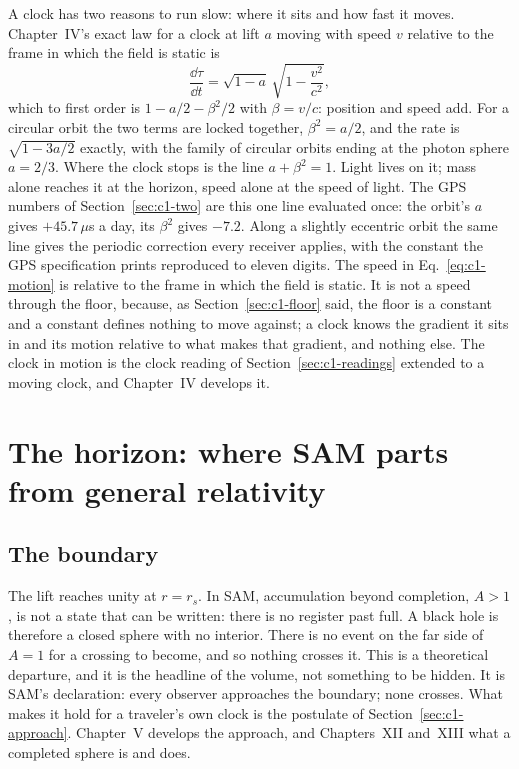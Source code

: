 A clock has two reasons to run slow: where it sits and how fast it moves. Chapter~IV's exact law for a clock at lift $a$ moving with speed $v$ relative to the frame in which the field is static is
\begin{equation}
\frac{\dd\tau}{\dd t}=\sqrt{1-a}\,\sqrt{1-\frac{v^2}{c^2}},
\label{eq:c1-motion}
\end{equation}
which to first order is $1-a/2-\beta^2/2$ with $\beta=v/c$: position and speed add. For a circular orbit the two terms are locked together, $\beta^2=a/2$, and the rate is $\sqrt{1-3a/2}$ exactly, with the family of circular orbits ending at the photon sphere $a=2/3$. Where the clock stops is the line $a+\beta^2=1$. Light lives on it; mass alone reaches it at the horizon, speed alone at the speed of light. The GPS numbers of Section~\ref{sec:c1-two} are this one line evaluated once: the orbit's $a$ gives $+45.7\,\mu$s a day, its $\beta^2$ gives $-7.2$. Along a slightly eccentric orbit the same line gives the periodic correction every receiver applies, with the constant the GPS specification prints reproduced to eleven digits. The speed in Eq.~\eqref{eq:c1-motion} is relative to the frame in which the field is static. It is not a speed through the floor, because, as Section~\ref{sec:c1-floor} said, the floor is a constant and a constant defines nothing to move against; a clock knows the gradient it sits in and its motion relative to what makes that gradient, and nothing else. The clock in motion is the clock reading of Section~\ref{sec:c1-readings} extended to a moving clock, and Chapter~IV develops it.

\section{The horizon: where SAM parts from general relativity}
\label{sec:c1-home}

\subsection{The boundary}

The lift reaches unity at $r=r_s$. In SAM, accumulation beyond completion, $A>1$, is not a state that can be written: there is no register past full. A black hole is therefore a closed sphere with no interior. There is no event on the far side of $A=1$ for a crossing to become, and so nothing crosses it. This is a theoretical departure, and it is the headline of the volume, not something to be hidden. It is SAM's declaration: every observer approaches the boundary; none crosses. What makes it hold for a traveler's own clock is the postulate of Section~\ref{sec:c1-approach}. Chapter~V develops the approach, and Chapters~XII and~XIII what a completed sphere is and does.

